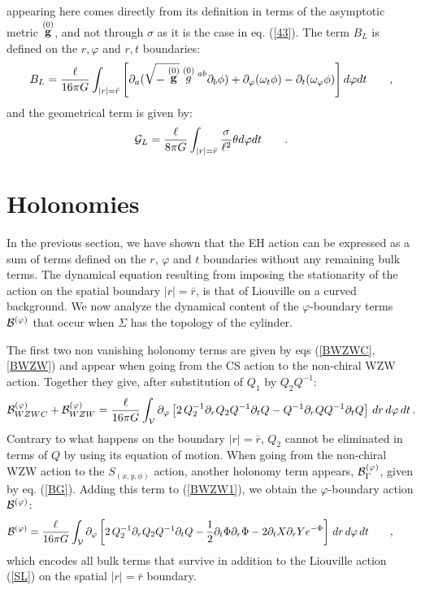 \documentclass[a4paper,10pt]{article}
\begin{document}
appearing here comes directly from its definition in terms of the asymptotic
metric $\stackrel {(0)} {\bf g}$, and not through $\sigma$ as it is the case 
in eq. (\ref {43}). 
The term  ${ B}_L$ is defined on the ${r, \varphi}$ and  
${r, t}$ boundaries:
\begin{equation}
\label{BBL}
{B}_L= \frac {\ell} {16 \pi G} \int _{|r|=\bar r}
\left [
\partial_a (\sqrt{- \stackrel {(0)} {\bf g}} \stackrel {(0)} g \strut ^{ab}
\partial_b \phi) 
+ \partial_\varphi (\omega_t \phi) -
 \partial_t (\omega_\varphi \phi) \right ] d\varphi dt \qquad ,
\end{equation}
and the geometrical term is given by:
\begin{equation}
\label{GL}
{\cal G}_L = \frac \ell {8 \pi G} \int _{|r|=\bar r} \frac \sigma {\ell^2}
\theta d\varphi dt \qquad .
\end{equation}

\section{Holonomies}

In the previous section, we have shown that the EH action can be
expressed as a sum of terms defined on the $r$, $\varphi$ and $t$
boundaries without any remaining bulk terms. The dynamical equation
resulting from imposing the stationarity of the action on the spatial
boundary $|r|=\bar r$, is that of Liouville on a curved background.
We now analyze the dynamical content of the $\varphi$-boundary terms
${\cal B}^{(\varphi)}$ that occur when $\Sigma $ has the topology of the 
cylinder.

The first two non vanishing holonomy terms are given by
eqs (\ref{BWZWC}, \ref{BWZW}) and appear when going from
the CS action to the non-chiral WZW action. Together they give, 
after substitution of $Q_1$ by $Q_2Q^{-1}$:
\begin{equation}
\label{BWZW1}
{\cal B}^{(\varphi)}_{WZWC} + {\cal B}^{(\varphi)}_{WZW}=
\frac \ell {16 \pi G} \int_{\cal V} \partial_\varphi
\left [ 2 \, Q_2^{-1} \partial_r Q_2 Q^{-1} \partial_t Q -
         Q^{-1} \partial_r Q Q^{-1} \partial_t Q \right ] 
\, dr \, d\varphi \, dt \, .
\end{equation}
Contrary to what happens on the boundary $|r|=\bar r$,
$Q_2$ cannot be eliminated in terms of $Q$ by using its equation of motion.
When going from the non-chiral WZW action to the $S_{(x, y, \phi)}$
action, another holonomy term
appears, ${\cal B}^{(\varphi)}_{\Gamma}$,
given by eq. (\ref{BG}). Adding this term to (\ref{BWZW1}),
we obtain the $\varphi$-boundary action ${\cal B}^{(\varphi)}$:
\begin{equation}
\label{BPHI}
{\cal B}^{(\varphi)}= \frac \ell {16 \pi G} \int_{\cal V} \partial_\varphi
\left [ 2 \, Q_2^{-1} \partial_r Q_2 Q^{-1} \partial_t Q 
 - \frac 1 2 \partial_t \Phi \partial_r \Phi - 2  \partial_t X \partial_r Y
 e^{-\Phi} \right ] \, dr \, d\varphi \, dt \qquad , \qquad
\end{equation}
which encodes all bulk terms that survive in addition to the 
Liouville action  (\ref{SL}) on the spatial $|r|=\bar r$ boundary.
\end{document}
